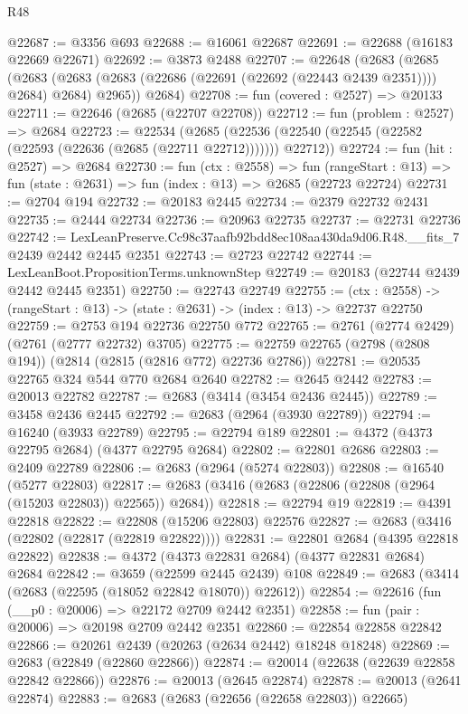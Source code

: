 \begin{lexlean}{R48}
\begin{coremodule}
@22687 := @3356 @693
@22688 := @16061 @22687
@22691 := @22688 (@16183 @22669 @22671)
@22692 := @3873 @2488
@22707 := @22648
    (@2683
      (@2685
        (@2683 (@2683 (@2683 (@22686 (@22691 (@22692 (@22443 @2439 @2351)))) @2684) @2684) @2965))
      @2684)
@22708 := fun (covered : @2527) => @20133
@22711 := @22646 (@2685 (@22707 @22708))
@22712 := fun (problem : @2527) => @2684
@22723 := @22534
    (@2685 (@22536 (@22540 (@22545 (@22582 (@22593 (@22636 (@2685 (@22711 @22712))))))) @22712))
@22724 := fun (hit : @2527) => @2684
@22730 := fun (ctx : @2558) =>
  fun (rangeStart : @13) => fun (state : @2631) => fun (index : @13) => @2685 (@22723 @22724)
@22731 := @2704 @194
@22732 := @20183 @2445
@22734 := @2379 @22732 @2431
@22735 := @2444 @22734
@22736 := @20963 @22735
@22737 := @22731 @22736
@22742 := LexLeanPreserve.Cc98c37aafb92bdd8ec108aa430da9d06.R48.__fits_7 @2439 @2442 @2445 @2351
@22743 := @2723 @22742
@22744 := LexLeanBoot.PropositionTerms.unknownStep
@22749 := @20183 (@22744 @2439 @2442 @2445 @2351)
@22750 := @22743 @22749
@22755 := (ctx : @2558) -> (rangeStart : @13) -> (state : @2631) -> (index : @13) -> @22737 @22750
@22759 := @2753 @194 @22736 @22750 @772
@22765 := @2761 (@2774 @2429) (@2761 (@2777 @22732) @3705)
@22775 := @22759 @22765 (@2798 (@2808 @194)) (@2814 (@2815 (@2816 @772) @22736 @2786))
@22781 := @20535 @22765 @324 @544 @770 @2684 @2640
@22782 := @2645 @2442
@22783 := @20013 @22782
@22787 := @2683 (@3414 (@3454 @2436 @2445))
@22789 := @3458 @2436 @2445
@22792 := @2683 (@2964 (@3930 @22789))
@22794 := @16240 (@3933 @22789)
@22795 := @22794 @189
@22801 := @4372 (@4373 @22795 @2684) (@4377 @22795 @2684)
@22802 := @22801 @2686
@22803 := @2409 @22789
@22806 := @2683 (@2964 (@5274 @22803))
@22808 := @16540 (@5277 @22803)
@22817 := @2683 (@3416 (@2683 (@22806 (@22808 (@2964 (@15203 @22803)) @22565)) @2684))
@22818 := @22794 @19
@22819 := @4391 @22818
@22822 := @22808 (@15206 @22803) @22576
@22827 := @2683 (@3416 (@22802 (@22817 (@22819 @22822))))
@22831 := @22801 @2684 (@4395 @22818 @22822)
@22838 := @4372 (@4373 @22831 @2684) (@4377 @22831 @2684) @2684
@22842 := @3659 (@22599 @2445 @2439) @108
@22849 := @2683 (@3414 (@2683 (@22595 (@18052 @22842 @18070)) @22612))
@22854 := @22616 (fun (__p0 : @20006) => @22172 @2709 @2442 @2351)
@22858 := fun (pair : @20006) => @20198 @2709 @2442 @2351
@22860 := @22854 @22858 @22842
@22866 := @20261 @2439 (@20263 (@2634 @2442) @18248 @18248)
@22869 := @2683 (@22849 (@22860 @22866))
@22874 := @20014 (@22638 (@22639 @22858 @22842 @22866))
@22876 := @20013 (@2645 @22874)
@22878 := @20013 (@2641 @22874)
@22883 := @2683 (@2683 (@22656 (@22658 @22803)) @22665)

\end{coremodule}
\end{lexlean}
